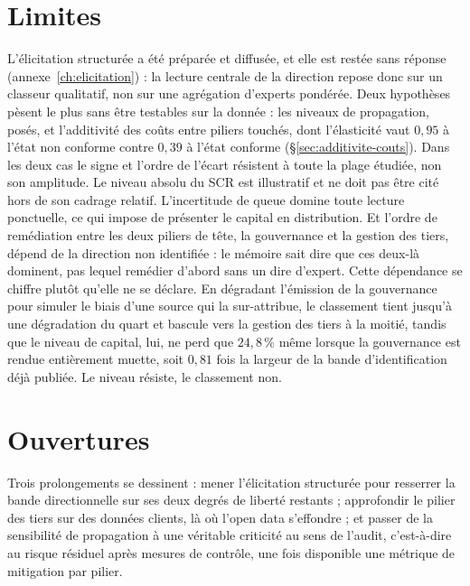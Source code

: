 \section{Limites}
L'élicitation structurée a été préparée et diffusée, et elle est restée sans réponse
(annexe~\ref{ch:elicitation}) : la lecture centrale de la direction repose donc sur un classeur
qualitatif, non sur une agrégation d'experts pondérée. Deux hypothèses pèsent le plus sans être testables sur la donnée : les
niveaux de propagation, posés, et l'additivité des coûts entre piliers touchés, dont
l'élasticité vaut $0{,}95$ à l'état non conforme contre $0{,}39$ à l'état conforme
(\S\ref{sec:additivite-couts}). Dans les deux cas le signe et l'ordre de l'écart résistent à
toute la plage étudiée, non son amplitude. Le
niveau absolu du SCR est illustratif et ne doit pas être cité hors de son cadrage relatif.
L'incertitude de queue domine toute lecture ponctuelle, ce qui impose de présenter le capital
en distribution. Et l'ordre de remédiation entre les deux piliers de tête, la gouvernance et
la gestion des tiers, dépend de la direction non identifiée : le mémoire sait dire que ces
deux-là dominent, pas lequel remédier d'abord sans un dire d'expert. Cette dépendance se chiffre
plutôt qu'elle ne se déclare. En dégradant l'émission de la gouvernance pour simuler le biais
d'une source qui la sur-attribue, le classement tient jusqu'à une dégradation du quart et bascule
vers la gestion des tiers à la moitié, tandis que le niveau de capital, lui, ne perd que
$24{,}8\,\%$ même lorsque la gouvernance est rendue entièrement muette, soit $0{,}81$ fois la
largeur de la bande d'identification déjà publiée. Le niveau résiste, le classement non.


\section{Ouvertures}
Trois prolongements se dessinent : mener l'élicitation structurée pour resserrer la bande
directionnelle sur ses deux degrés de liberté restants ; approfondir le pilier des tiers sur
des données clients, là où l'open data s'effondre ; et passer de la sensibilité de
propagation à une véritable criticité au sens de l'audit, c'est-à-dire au risque résiduel
après mesures de contrôle, une fois disponible une métrique de mitigation par pilier.

